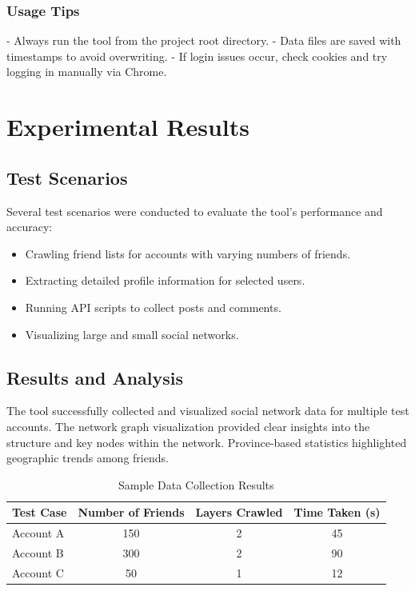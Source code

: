 \documentclass[13pt,a4paper]{report}
\begin{document}
\subsection{Usage Tips}
- Always run the tool from the project root directory.
- Data files are saved with timestamps to avoid overwriting.
- If login issues occur, check cookies and try logging in manually via Chrome.

\chapter{Experimental Results}
\section{Test Scenarios}
Several test scenarios were conducted to evaluate the tool's performance and accuracy:
\begin{itemize}
    \item Crawling friend lists for accounts with varying numbers of friends.
    \item Extracting detailed profile information for selected users.
    \item Running API scripts to collect posts and comments.
    \item Visualizing large and small social networks.
\end{itemize}

\section{Results and Analysis}
The tool successfully collected and visualized social network data for multiple test accounts. The network graph visualization provided clear insights into the structure and key nodes within the network. Province-based statistics highlighted geographic trends among friends.

\begin{table}[h!]
    \centering
    \caption{Sample Data Collection Results}
    \begin{tabular}{@{}lccc@{}}
        \toprule
        Test Case & Number of Friends & Layers Crawled & Time Taken (s) \\
        \midrule
        Account A & 150 & 2 & 45 \\
        Account B & 300 & 2 & 90 \\
        Account C & 50 & 1 & 12 \\
        \bottomrule
    \end{tabular}
\end{table}
\end{document}
